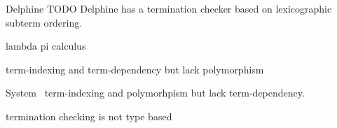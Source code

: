 Delphine \cite{pos08phd} TODO
Delphine has a termination checker based on lexicographic subterm ordering.

lambda pi calculus

term-indexing and term-dependency 
but lack polymorphism

System \Fi\
term-indexing and polymorhpism
but lack term-dependency.


termination checking is not type based


